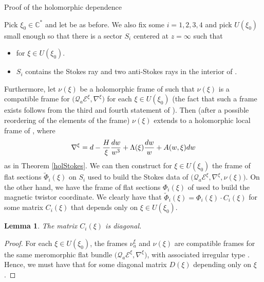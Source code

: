 \documentclass[11pt]{article}
\numberwithin{equation}{section}
\newtheorem{Lemma}[Theorem]{Lemma}
\numberwithin{equation}{section}
\begin{document}
\begin{subsubsection}{Proof of the holomorphic dependence}\label{proofhol}

Pick $\xi_0 \in \mathbb{C}^*$ and let  be as before. We also fix some $i=1,2,3,4$ and pick $U(\xi_0)$ small enough so that there is a sector $S_i$ centered at $z=\infty$ such that
\begin{itemize}\itemsep=0pt
 \item {} for $\xi \in U(\xi_0)$.
 \item $S_i$ contains the Stokes ray and two anti-Stokes rays in the interior of .
\end{itemize}

Furthermore, let $\nu(\xi)$ be a holomorphic frame of  such that $\nu(\xi)$ is a compatible frame for $\bigl(\mathcal{Q}_a\mathcal{E}^{\xi},\nabla^{\xi}\bigr)$ for each $\xi \in U(\xi_0)$ (the fact that such a frame exists follows from the third and fourth statement of \cite[Theorem 11.1.2]{M}). Then (after a possible reordering of the elements of the frame) $\nu(\xi)$ extends to a holomorphic local frame of , where
\begin{equation*}
 \nabla^{\xi}= {\rm d} -\frac{H}{\xi}\frac{{\rm d}w}{w^3}+\Lambda(\xi)\frac{{\rm d}w}{w} + A(w,\xi){\rm d}w
\end{equation*}
as in Theorem \ref{holStokes}. We can then construct for $\xi\in U(\xi_0)$ the frame of flat sections $\widetilde{\Phi}_i(\xi)$ on $S_i$ used to build the Stokes data of $\bigl(\mathcal{Q}_a\mathcal{E}^{\xi},\nabla^{\xi},\nu(\xi)\bigr)$. On the other hand, we have the frame of flat sections $\Phi_i(\xi)$ of  used to build the magnetic twistor coordinate. We clearly have that $\widetilde{\Phi}_i(\xi)=\Phi_i(\xi)\cdot C_i(\xi)$ for some matrix $C_i(\xi)$ that depends only on $\xi \in U(\xi_0)$.

\begin{Lemma}\label{diag} The matrix $C_i(\xi)$ is diagonal.

\end{Lemma}

\begin{proof}
For each $\xi \in U(\xi_0)$, the frames $\nu_a^{\xi}$ and $\nu(\xi)$ are compatible frames for the same meromorphic flat bundle $\bigl(\mathcal{Q}_a\mathcal{E}^{\xi},\nabla^{\xi}\bigr)$, with associated irregular type
.
Hence, we must have that  for some diagonal matrix $D(\xi)$ depending only on $\xi$.


\end{proof}
\end{subsubsection}
\end{document}
